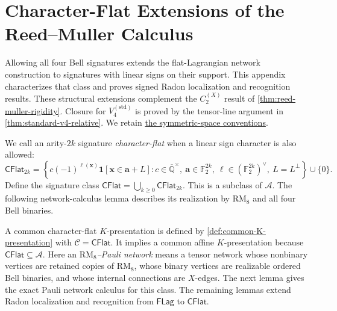 \documentclass[11pt,letterpaper,onecolumn]{article}
\theoremstyle{plain}
\theoremstyle{definition}
\theoremstyle{remark}
\newcommand{\AlgNums}{\overline{\mathbb Q}}
\newcommand{\Ftwo}{\mathbb F_2}
\newcommand{\cA}{\mathscr A}
\newcommand{\cC}{\mathscr C}
\newcommand{\CycX}[1]{{C_{#1}^{(X)}}}
\newcommand{\KleinStd}{{V_4^{(\mathrm{std})}}}
\newcommand{\FLag}{\mathsf{FLag}}
\newcommand{\one}{\mathbf 1}
\newcommand{\RMcore}{\mathrm{RM}_8}
\begin{document}
\section{Character-Flat Extensions of the Reed--Muller Calculus}
\label{proofsubsec:rm-pauli-tools}
\label{proofsec:reed-muller}

Allowing all four Bell signatures extends the flat-Lagrangian network
construction to signatures with linear signs on their support. This
appendix characterizes that class and proves signed Radon localization
and recognition results. These structural extensions complement the
\(\CycX{2}\) result of \cref{thm:reed-muller-rigidity}. Closure for \(\KleinStd\) is proved by the
tensor-line argument in \cref{thm:standard-v4-relative}.
We retain \hyperref[subsubsec:symmetric-binary-spaces]{the symmetric-space conventions}.

We call an arity-\(2k\) signature \emph{character-flat} when a linear sign
character is also allowed:
\begin{equation}
 \mathsf{CFlat}_{2k}
 =\left\{
 c(-1)^{\ell({\mathbf{x}})}\one[{\mathbf{x}}\in {\mathbf{a}}+L]:
 c\in\AlgNums^\times,\ {\mathbf{a}}\in\Ftwo^{2k},\ \ell\in(\Ftwo^{2k})^\vee,
 \ L=L^\perp
 \right\}\cup\{0\}.
 \label{eq:character-flat-class}
\end{equation}
Define the signature class
\(\mathsf{CFlat}=\bigcup_{k\ge0}\mathsf{CFlat}_{2k}\).  This is a
subclass of \(\cA\).  The following network-calculus lemma describes
its realization by \(\RMcore\) and all four Bell binaries.

A common character-flat \(K\)-presentation is defined by
\cref{def:common-K-presentation} with \(\cC=\mathsf{CFlat}\).
It implies a common affine \(K\)-presentation because
\(\mathsf{CFlat}\subseteq\cA\).  Here an
\emph{\(\RMcore\)--Pauli network} means a tensor network whose
nonbinary vertices are retained copies of \(\RMcore\), whose binary
vertices are realizable ordered Bell binaries, and whose internal connections
are \(X\)-edges.  The next lemma gives the exact Pauli network
calculus for this class.  
The remaining lemmas extend Radon localization and recognition from
\(\FLag\) to \(\mathsf{CFlat}\).
\end{document}
